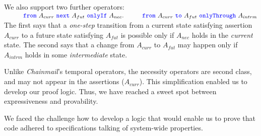 We also support two further \Nec operators:
\\
$ 
\strut \hspace{.4in} {\color{blue}\texttt{from}}\ A_{curr}\ {\color{blue}\texttt{next}}\ A_{fut}\ {\color{blue}\texttt{onlyIf}}\ A_{nec}. \strut \hspace{.4in} {\color{blue}\texttt{from}}\ A_{curr}\ {\color{blue}\texttt{to}}\ A_{fut}\ {\color{blue}\texttt{onlyThrough}}\ A_{intrm}
$ 
\\
{The  first says    that 
a  \emph{one-step} {transition} from a current state satisfying assertion $A_{curr}$ to a future
state satisfying $A_{fut}$  
is possible only if %
$A_{nec}$ holds in the \emph{current} state.   
The   second says that a change from %
 $A_{curr}$ to  $A_{fut}$  may happen only if %
 $A_{intrm}$ holds in some \emph{intermediate} state.}
 
  
  \vspace{.02in}
  
Unlike  \emph{Chainmail}'s temporal operators, 
 the necessity operators %
 are second class, and may not appear in the assertions  {(\eg  ${A_{curr}}$)}. 
 This simplification enabled us to develop our proof logic. 
 Thus, we {have reached} a  sweet spot between expressiveness and 
 provability.
 
We faced the challenge  how to develop a logic that would enable us to prove that code 
 adhered to  specifications {talking of system-wide properties.} 
 
  

